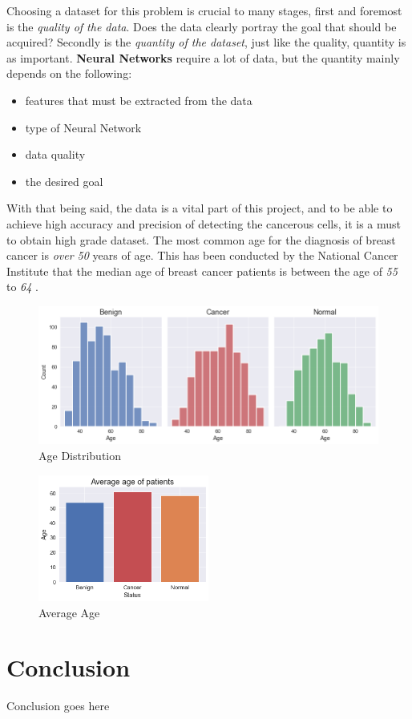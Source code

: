 \documentclass[12pt]{extarticle}
\begin{document}
	Choosing a dataset for this problem is crucial to many stages, first and foremost is the \emph{quality of the data}. Does the data clearly portray the goal that should be acquired? Secondly is the \emph{quantity of the dataset}, just like the quality, quantity is as important. \textbf{Neural Networks} require a lot of data, but the quantity mainly depends on the following:
	\begin{itemize}
		\item features that must be extracted from the data
		\item type of Neural Network
		\item data quality
		\item the desired goal
	\end{itemize}
	With that being said, the data is a vital part of this project, and to be able to achieve high accuracy and precision of detecting the cancerous cells, it is a must to obtain high grade dataset. 
	The most common age for the diagnosis of breast cancer is \emph{over 50} years of age. This has been conducted by the National Cancer Institute that the median age of breast cancer patients is between the age of \emph{55} to \emph{64} \cite{CDC}. 
	\\[5mm]
	
	
	\begin{figure}[h]
		\centering
		\includegraphics[width=1\textwidth]{pics/Figures/Age_Dist.png}
		\caption{\small{Age Distribution}}
		\label{fig:Age_Dist}
	\end{figure}
	\begin{figure}[h]
		\centering
		\includegraphics[width=0.5\textwidth]{pics/Figures/Avg_Age.png}
		\caption{\small{Average Age}}
		\label{fig:Avg_Age}
	\end{figure}
	
	\newpage	
	\section{Conclusion}
	Conclusion goes here
	\newpage

	
	
	
	
\end{document}

